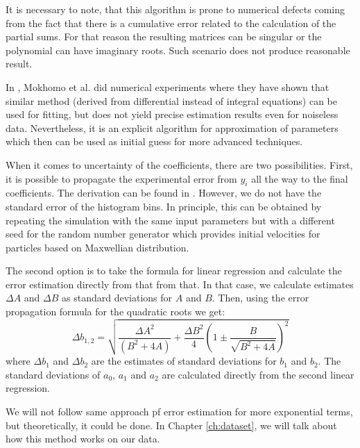 It is necessary to note, that this algorithm is prone to numerical defects coming from the fact that there is a cumulative error related to the calculation of the partial sums. For that reason the resulting matrices can be singular or the polynomial can have imaginary roots. Such scenario does not produce reasonable result.

In \cite{mokhomo2021}, Mokhomo et al. did numerical experiments where they have shown that similar method (derived from differential instead of integral equations) can be used for fitting, but does not yield precise estimation results even for noiseless data. Nevertheless, it is an explicit algorithm for approximation of parameters which then can be used as initial guess for more advanced techniques.

When it comes to uncertainty of the coefficients, there are two possibilities. First, it is possible to propagate the experimental error from $y_i$ all the way to the final coefficients. The derivation can be found in \cite{lecca2021}. However, we do not have the standard error of the histogram bins. In principle, this can be obtained by repeating the simulation with the same input parameters but with a different seed for the random number generator which provides initial velocities for particles based on Maxwellian distribution. 

The second option is to take the formula for linear regression and calculate the error estimation directly from that from that. In that case, we calculate estimates $\Delta A$ and $\Delta B$ as standard deviations for $A$ and $B$. Then, using the error propagation formula for the quadratic roots we get:
\begin{equation}
	\label{eq:b-coef-error1}
	\Delta b_{1,2} = \sqrt{\frac{\Delta A^2}{(B^2 + 4A)} + \frac{\Delta B^2}{4} \left(1 \pm \frac{B}{\sqrt{B^2 + 4A}}\right)^2}
\end{equation}
where $\Delta b_1$ and $\Delta b_2$ are the estimates of standard deviations for $b_1$ and $b_2$.
The standard deviations of $a_0$, $a_1$ and $a_2$ are calculated directly from the second linear regression.

We will not follow same approach pf error estimation for more exponential terms, but theoretically, it could be done. In Chapter \ref{ch:dataset}, we will talk about how this method works on our data.

